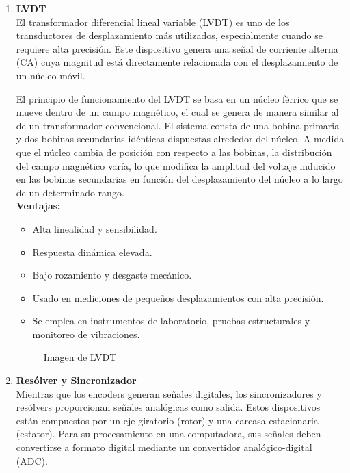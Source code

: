 \begin{enumerate}
\begin{enumerate}
\begin{enumerate}
\vspace{60mm}
			\item \textbf{LVDT}
			\\
		El transformador diferencial lineal variable (LVDT) es uno de los transductores de desplazamiento más utilizados, especialmente cuando se requiere alta precisión. Este dispositivo genera una señal de corriente alterna (CA) cuya magnitud está directamente relacionada con el desplazamiento de un núcleo móvil.
		
		El principio de funcionamiento del LVDT se basa en un núcleo férrico que se mueve dentro de un campo magnético, el cual se genera de manera similar al de un transformador convencional. El sistema consta de una bobina primaria y dos bobinas secundarias idénticas dispuestas alrededor del núcleo. A medida que el núcleo cambia de posición con respecto a las bobinas, la distribución del campo magnético varía, lo que modifica la amplitud del voltaje inducido en las bobinas secundarias en función del desplazamiento del núcleo a lo largo de un determinado rango.\cite{saha2010robotics}
		\\
		
		\textbf{Ventajas:}
		\begin{itemize}
			\item Alta linealidad y sensibilidad.
			\item Respuesta dinámica elevada.
			\item Bajo rozamiento y desgaste mecánico.
			\item Usado en mediciones de pequeños desplazamientos con alta precisión.
			\item Se emplea en instrumentos de laboratorio, pruebas estructurales y monitoreo de vibraciones.
		\end{itemize}
		
		\begin{figure}[!h]
			\centering
			\caption{Imagen de LVDT}
			\label{fig:figura_sensores}
		\end{figure}
\medspace		

			
			\item \textbf{Resólver y Sincronizador}\\
			Mientras que los encoders generan señales digitales, los sincronizadores y resólvers proporcionan señales analógicas como salida. Estos dispositivos están compuestos por un eje giratorio (rotor) y una carcasa estacionaria (estator). Para su procesamiento en una computadora, sus señales deben convertirse a formato digital mediante un convertidor analógico-digital (ADC).
			

\end{enumerate}
\end{enumerate}
\end{enumerate}
